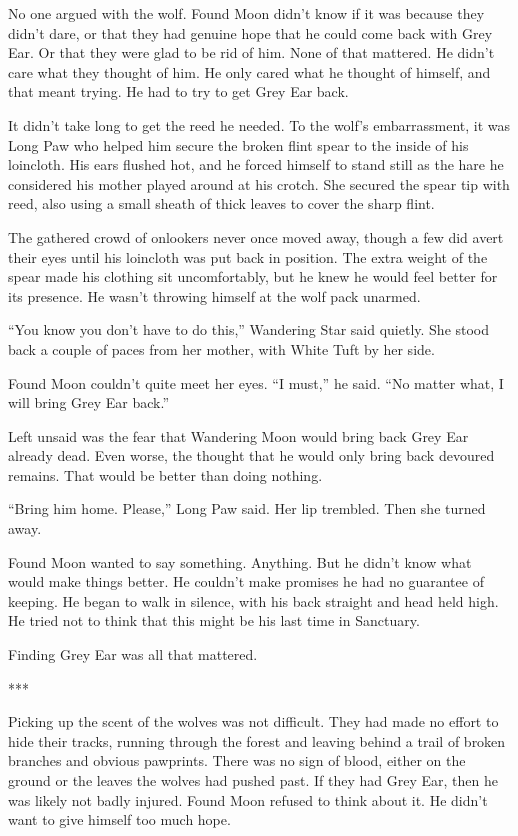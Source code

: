 No one argued with the wolf. Found Moon didn't know if it was because they didn't dare, or that they had genuine hope that he could come back with Grey Ear. Or that they were glad to be rid of him. None of that mattered. He didn't care what they thought of him. He only cared what he thought of himself, and that meant trying. He had to try to get Grey Ear back.

It didn't take long to get the reed he needed. To the wolf's embarrassment, it was Long Paw who helped him secure the broken flint spear to the inside of his loincloth. His ears flushed hot, and he forced himself to stand still as the hare he considered his mother played around at his crotch. She secured the spear tip with reed, also using a small sheath of thick leaves to cover the sharp flint.

The gathered crowd of onlookers never once moved away, though a few did avert their eyes until his loincloth was put back in position. The extra weight of the spear made his clothing sit uncomfortably, but he knew he would feel better for its presence. He wasn't throwing himself at the wolf pack unarmed.

``You know you don't have to do this,'' Wandering Star said quietly. She stood back a couple of paces from her mother, with White Tuft by her side.

Found Moon couldn't quite meet her eyes. ``I must,'' he said. ``No matter what, I will bring Grey Ear back.''

Left unsaid was the fear that Wandering Moon would bring back Grey Ear already dead. Even worse, the thought that he would only bring back devoured remains. That would be better than doing nothing.

``Bring him home. Please,'' Long Paw said. Her lip trembled. Then she turned away.

Found Moon wanted to say something. Anything. But he didn't know what would make things better. He couldn't make promises he had no guarantee of keeping. He began to walk in silence, with his back straight and head held high. He tried not to think that this might be his last time in Sanctuary.

Finding Grey Ear was all that mattered.

***

Picking up the scent of the wolves was not difficult. They had made no effort to hide their tracks, running through the forest and leaving behind a trail of broken branches and obvious pawprints. There was no sign of blood, either on the ground or the leaves the wolves had pushed past. If they had Grey Ear, then he was likely not badly injured. Found Moon refused to think about it. He didn't want to give himself too much hope.

